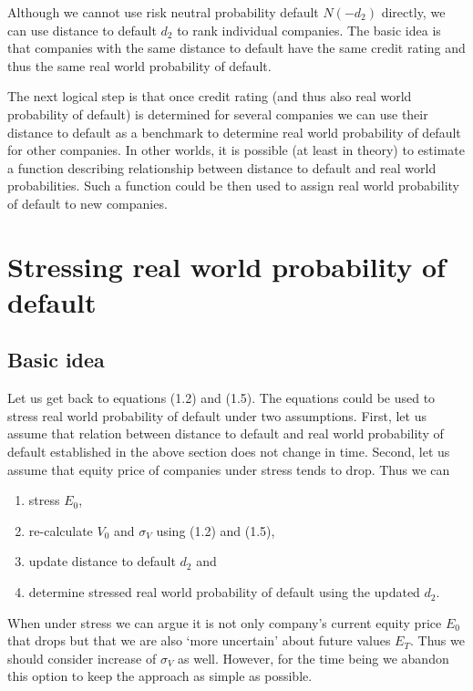 \documentclass[a4paper]{book}
\begin{document}
Although we cannot use risk neutral probability default $N(-d_2)$ directly, we can use distance to default $d_2$ to rank individual companies. The basic idea is that companies with the same distance to default have the same credit rating and thus the same real world probability of default.

The next logical step is that once credit rating (and thus also real world probability of default) is determined for several companies we can use their distance to default as a benchmark to determine real world probability of default for other companies. In other worlds, it is possible (at least in theory) to estimate a function describing relationship between distance to default and real world probabilities. Such a function could be then used to assign real world probability of default to new companies.

\section{Stressing real world probability of default}

\subsection{Basic idea}

Let us get back to equations (1.2) and (1.5). The equations could be used to stress real world probability of default under two assumptions. First, let us assume that relation between distance to default and real world probability of default established in the above section does not change in time. Second, let us assume that equity price of companies under stress tends to drop. Thus we can
\begin{enumerate}
\item stress $E_0$,
\item re-calculate $V_0$ and $\sigma_V$ using (1.2) and (1.5),
\item update distance to default $d_2$ and
\item determine stressed real world probability of default using the updated $d_2$.
\end{enumerate}

When under stress we can argue it is not only company's current equity price $E_0$ that drops but that we are also `more uncertain' about future values $E_T$. Thus we should consider increase of $\sigma_V$ as well. However, for the time being we abandon this option to keep the approach as simple as possible.
\end{document}
